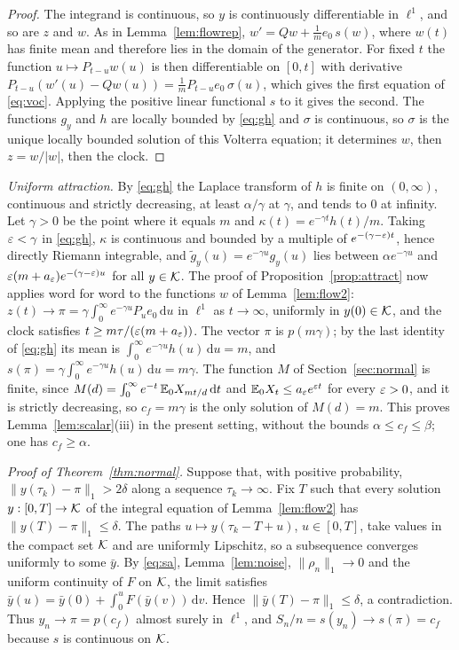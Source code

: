 \begin{proof}
The integrand is continuous, so $y$ is continuously differentiable in $\ell^1$, and so are $z$ and $w$. As in
Lemma~\ref{lem:flowrep}, $w'=Qw+\frac1me_0\,s(w)$, where $w(t)$ has finite mean and therefore lies in the domain of
the generator. For fixed $t$ the function $u\mapsto P_{t-u}w(u)$ is then differentiable on $[0,t]$ with derivative
$P_{t-u}(w'(u)-Qw(u))=\frac1mP_{t-u}e_0\,\sigma(u)$, which gives the first equation of \eqref{eq:voc}. Applying the
positive linear functional $s$ to it gives the second. The functions $g_y$ and $h$ are locally bounded by
\eqref{eq:gh} and $\sigma$ is continuous, so $\sigma$ is the unique locally bounded solution of this Volterra
equation; it determines $w$, then $z=w/|w|$, then the clock.
\end{proof}

\emph{Uniform attraction.} By \eqref{eq:gh} the Laplace transform of $h$ is finite on $(0,\infty)$, continuous
and strictly decreasing, at least $\alpha/\gamma$ at $\gamma$, and tends to $0$ at infinity. Let $\gamma>0$ be the
point where it equals $m$ and $\kappa(t)=e^{-\gamma t}h(t)/m$. Taking $\varepsilon<\gamma$ in \eqref{eq:gh}, $\kappa$ is
continuous and bounded by a multiple of $e^{-(\gamma-\varepsilon)t}$, hence directly Riemann integrable, and
$\tilde g_y(u)=e^{-\gamma u}g_y(u)$ lies between $\alpha e^{-\gamma u}$ and $\varepsilon(m+a_\varepsilon)e^{-(\gamma-\varepsilon)u}$ for
all $y\in\mathcal{K}$. The proof of Proposition~\ref{prop:attract} now applies word for word to the functions $w$ of
Lemma~\ref{lem:flow2}: $z(t)\to\pi=\gamma\int_0^\infty e^{-\gamma u}P_ue_0\,\mathrm du$ in $\ell^1$ as
$t\to\infty$, uniformly in $y(0)\in\mathcal{K}$, and the clock satisfies $t\ge m\tau/(\varepsilon(m+a_\varepsilon))$. The vector $\pi$ is
$p(m\gamma)$; by the last identity of \eqref{eq:gh} its mean is $\int_0^\infty e^{-\gamma u}h(u)\,\mathrm du=m$,
and $s(\pi)=\gamma\int_0^\infty e^{-\gamma u}h(u)\,\mathrm du=m\gamma$. The function $M$ of
Section~\ref{sec:normal} is finite, since $M(d)=\int_0^\infty e^{-t}\,\mathbb{E}_0X_{mt/d}\,\mathrm dt$ and
$\mathbb{E}_0X_t\le a_\varepsilon e^{\varepsilon t}$ for every $\varepsilon>0$, and it is strictly decreasing, so $c_f=m\gamma$
is the only solution of $M(d)=m$. This proves Lemma~\ref{lem:scalar}(iii) in the present setting, without the
bounds $\alpha\le c_f\le\beta$; one has $c_f\ge\alpha$.

\emph{Proof of Theorem~\ref{thm:normal}.} Suppose that, with positive probability,
$\|y(\tau_k)-\pi\|_1>2\delta$ along a sequence $\tau_k\to\infty$. Fix $T$ such that every solution
$y:[0,T]\to\mathcal{K}$ of the integral equation of Lemma~\ref{lem:flow2} has $\|y(T)-\pi\|_1\le\delta$. The paths
$u\mapsto y(\tau_k-T+u)$, $u\in[0,T]$, take values in the compact set $\mathcal{K}$ and are uniformly Lipschitz, so a
subsequence converges uniformly to some $\bar y$. By \eqref{eq:sa}, Lemma~\ref{lem:noise}, $\|\rho_n\|_1\to0$ and
the uniform continuity of $F$ on $\mathcal{K}$, the limit satisfies $\bar y(u)=\bar y(0)+\int_0^uF(\bar y(v))\,\mathrm dv$.
Hence $\|\bar y(T)-\pi\|_1\le\delta$, a contradiction. Thus $y_n\to\pi=p(c_f)$ almost surely in $\ell^1$, and
$S_n/n=s(y_n)\to s(\pi)=c_f$ because $s$ is continuous on $\mathcal{K}$.

